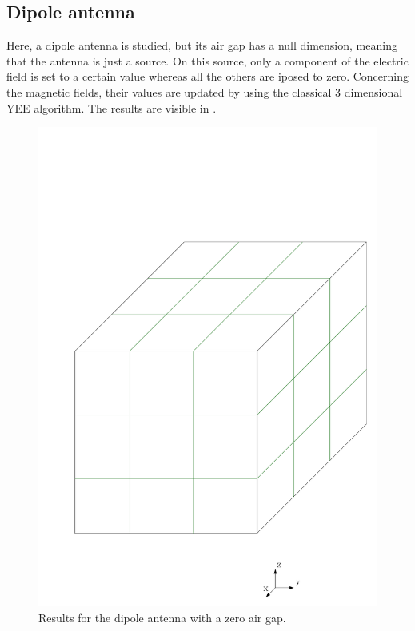 \documentclass[12 pt]{article}
\begin{document}
\subsection{Dipole antenna}
Here, a dipole antenna is studied, but its air gap has a null dimension, meaning that the antenna is just a source. On this source, only a component of the electric field is set to a certain value whereas all the others are iposed to zero. Concerning the magnetic fields, their values are updated by using the classical 3 dimensional YEE algorithm. The results are visible in .
%
\begin{figure}
	\centering
	\includegraphics[scale=0.5]{MPI_cubic_division}
	\caption{Results for the dipole antenna with a zero air gap.}
	\label{fig:DIPOLEANTENNA}
\end{figure}
%
\end{document}
